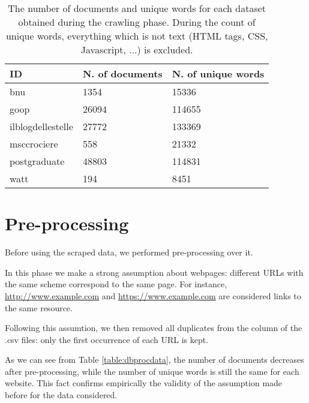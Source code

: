 \begin{table}[H]
    \begin{center}
        \begin{tabular}{ |l|l|l| }
            \hline
            ID                & N. of documents & N. of unique words \\
            \hline
            bnu               & 1354            & 15336              \\
            \hline
            goop              & 26094           & 114655             \\
            \hline
            ilblogdellestelle & 27772           & 133369             \\
            \hline
            msccrociere       & 558             & 21332              \\
            \hline
            postgraduate      & 48803           & 114831             \\
            \hline
            watt              & 194             & 8451               \\
            \hline
        \end{tabular}
    \end{center}
    \caption{
        The number of documents and unique words for each dataset obtained during the crawling phase.
        During the count of unique words, everything which is not text (HTML tags, CSS, Javascript, ...) is excluded.
    }
    \label{table:dbdata}
\end{table}

\section{Pre-processing}
Before using the scraped data, we performed pre-processing over it.

In this phase we make a strong assumption about webpages:
different URLs with the same scheme correspond to the same page.
For instance, \url{http://www.example.com} and \url{https://www.example.com}
are considered links to the same resource.

Following this assumtion, we then removed all duplicates from the  column
of the .csv files: only the first occurrence of each URL is kept.

As we can see from Table \ref{table:dbprocdata}, the number of documents decreases after pre-processing,
while the number of unique words is still the same for each website.
This fact confirms empirically the validity of the assumption made before for the data considered.

